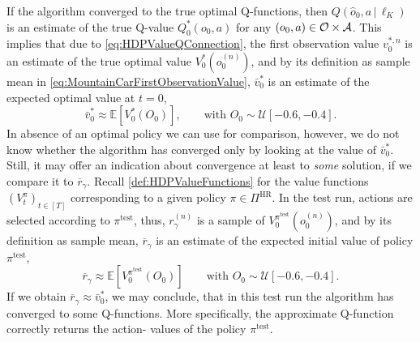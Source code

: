 \documentclass[
    a4paper,
    11pt,
    bibliography=totoc,
    listof=totoc,      
    headinclude=true,
    cleardoublepage=empty,
]{scrbook}
\theoremstyle{plain}
\theoremstyle{definition}
\theoremstyle{remark}
\newcommand{\E}{\mathbb E}
\newcommand{\SpaceA}{{\cal A}}
\newcommand{\SpaceO}{{\cal O}}
\begin{document}
If the algorithm converged to the true optimal Q-functions, then 
$Q(\hat{o}_0, a\,| \,\ell_K)$ is an estimate of the true Q-value $Q_0^*(o_0,
a)$ for any $(o_0, a)\in\SpaceO\times\SpaceA$. This implies that due to 
\cref{eq:HDPValueQConnection}, the first observation value $v_0^{*,n}$ is an 
estimate of the true optimal value $V_0^*(o^{(n)}_0)$, and by its definition 
as sample mean in \eqref{eq:MountainCarFirstObservationValue}, 
$\bar v_0^*$ is an estimate of the expected optimal value at $t=0$,
\[
    \bar v_0^* \approx \E[V_0^*(O_0)], 
    \qquad \text{with } 
    O_0\sim\mathcal{U}[-0.6, -0.4].
\]
In absence of an optimal policy we can use for comparison, however, we do not 
know whether the algorithm has converged only by looking at the value of $\bar
v_0^*$. Still, it may offer an indication about convergence at least to 
\textit{some} solution, if we compare it to $\overline{r}_\gamma$. Recall 
\cref{def:HDPValueFunctions} for the value functions $(V^\pi_t)_{t\in[T]}$ 
corresponding to a given policy $\pi\in\Pi^\text{HR}$. In the test run, 
actions are selected according to $\pi^\text{test}$, thus, $r^{(n)}_\gamma$ 
is a sample of $V_0^{\pi^\text{test}}(o^{(n)}_0)$, and by its definition as 
sample mean, $\overline{r}_\gamma$ is an estimate of the expected initial 
value of policy $\pi^\text{test}$,
\[
    \overline{r}_\gamma \approx \E[V^{\pi^\text{test}}_0(O_0)]
    \qquad \text{with } 
    O_0\sim\mathcal{U}[-0.6, -0.4].    
\]
If we obtain $\overline{r}_\gamma \approx \bar v_0^*$, we may conclude, that in
this test run the algorithm has converged to some Q-functions. More 
specifically, the approximate Q-function correctly returns the action-%
values of the policy $\pi^\text{test}$.
\end{document}
